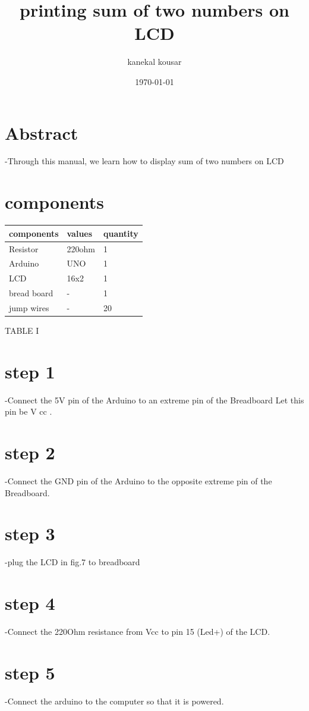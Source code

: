 \documentclass[twocolumn,13pt]{article}
\begin{document}
\title{\textbf{printing sum of two numbers on LCD}}

\author{kanekal kousar}
\date{\today}
\maketitle

 \section{Abstract}-Through this manual, we learn how to display sum of two numbers on LCD


\section{components}


\begin{tabular}{ |p{3cm}|p{1.5cm}|p{1.5cm}| }
 \hline
 \setlength{\tabcolsep}{3pt}
components & values & quantity \\
\hline
 Resistor  & 220ohm    &1\\
 Arduino &   UNO & 1\\
 LCD &16x2 & 1\\
 bread board  &-& 1\\
 jump wires&  - & 20\\
 \hline
\end{tabular}
\begin{center}
    TABLE I
\end{center}
 

\section*{step 1}
-Connect the 5V pin of the Arduino to an extreme pin of the Breadboard
Let this pin be V cc .
\section*{step 2}
-Connect the GND pin of the Arduino to the opposite extreme pin of the Breadboard.
\section*{step 3}
-plug the LCD in fig.7 to breadboard
\section*{step 4}
-Connect the 220Ohm resistance from Vcc to pin 15 (Led+) of the LCD.
\section*{step 5}
-Connect the arduino to the computer so that it is powered.
\end{document}
